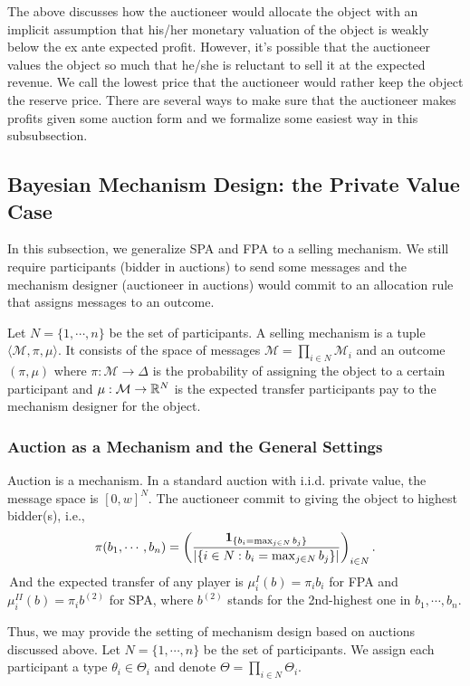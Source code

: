 The above discusses how the auctioneer would allocate the object with an implicit assumption that his/her monetary valuation of the object is weakly below the ex ante expected profit.
However, it's possible that the auctioneer values the object so much that he/she is reluctant to sell it at the expected revenue. We call the lowest price that the auctioneer would rather keep the object the reserve price. There are several ways to make sure that the auctioneer makes profits given some auction form and we formalize some easiest way in this subsubsection.

\subsection{Bayesian Mechanism Design: the Private Value Case}
In this subsection, we generalize SPA and FPA to a selling mechanism. We still require participants (bidder in auctions) to send some messages and the mechanism designer (auctioneer in auctions) would commit to an allocation rule that assigns messages to an outcome.
\begin{definition}
    Let $N=\{1,\cdots, n\}$ be the set of participants. A selling mechanism is a tuple $\langle \mathcal{M}, \pi, \mu \rangle $. It consists of the space of messages $\mathcal{M}=\prod_{i\in N}\mathcal{M}_i$ and an outcome $(\pi,\mu)$ where $\pi:\mathcal{M}\to \Delta$ is the probability of assigning the object to a certain participant and 
    $\mu:\mathcal{M}\to \mathbb{R}^N$ is the expected transfer participants pay to the mechanism designer for the object.
\end{definition}
\subsubsection{Auction as a Mechanism and the General Settings}
Auction is a mechanism. In a standard auction with i.i.d. private value, the message space is $[0,w]^N$. The auctioneer commit to giving the object to highest bidder(s), i.e., $$\pi(b_1,\cdots,b_n)=\left(\frac{\mathbf{1}_{\{b_i=\max_{j\in N}b_j\}}}{|\{i\in N:b_i=\max_{j\in N}b_j\}|}\right)_{i\in N}.$$
\,And the expected transfer of any player is $\mu^{I}_i(b)=\pi_i b_i$ for FPA and $\mu^{II}_i(b)=\pi_i b^{(2)}$ for SPA, where $b^{(2)}$ stands for the 2nd-highest one in $b_1,\cdots, b_n$.

Thus, we may provide the setting of mechanism design based on auctions discussed above. Let $N=\{1,\cdots, n\}$ be the set of participants. We assign each participant a type $\theta_i\in\Theta_i$ and denote $\Theta=\prod_{i\in N}\Theta_i$.  

